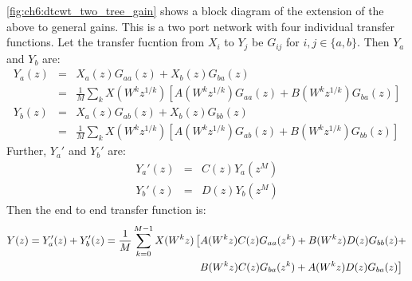 \autoref{fig:ch6:dtcwt_two_tree_gain} shows a block diagram of the extension of 
the above to general gains. This is a two port network with four individual
transfer functions. Let the transfer fucntion from $X_i$ to $Y_j$
be $G_{ij}$ for $i, j \in \{a, b\}$. Then $Y_a$ and $Y_b$ are:
\begin{eqnarray}
  Y_a(z) &=& X_a(z)G_{aa}(z) + X_b(z)G_{ba}(z) \\
         &=& \frac{1}{M} \sum_k X(W^{k} z^{1/k}) \left[A(W^k z^{1/k})G_{aa}(z) +
      B(W^k z^{1/k}) G_{ba}(z) \right] \\
      Y_b(z) &=& X_a(z)G_{ab}(z) + X_b(z)G_{bb}(z) \\
             &=& \frac{1}{M} \sum_k X(W^{k} z^{1/k}) \left[A(W^k z^{1/k})G_{ab}(z) +
      B(W^k z^{1/k}) G_{bb}(z) \right] 
\end{eqnarray}
%
Further, $Y_a'$ and $Y_b'$ are:
\begin{eqnarray}
  Y_a'(z) &=& C(z)Y_a(z^M) \\
  Y_b'(z) &=& D(z)Y_b(z^M)
\end{eqnarray}
%
Then the end to end transfer function is:
\begin{equation}
  \begin{split}
    Y(z) = Y_{a}'(z) + Y_{b}'(z) = \frac{1}{M} \sum_{k=0}^{M-1} X(W^k z)
    & \left[  A(W^kz)C(z)G_{aa}(z^k) + B(W^kz)D(z)G_{bb}(z) + \right. \\
    & \left. \hphantom{[}  B(W^kz)C(z)G_{ba}(z^k) + A(W^kz)D(z)G_{ba}(z) \right] 
    \label{eq:ch6:transfer}
  \end{split}
\end{equation}

